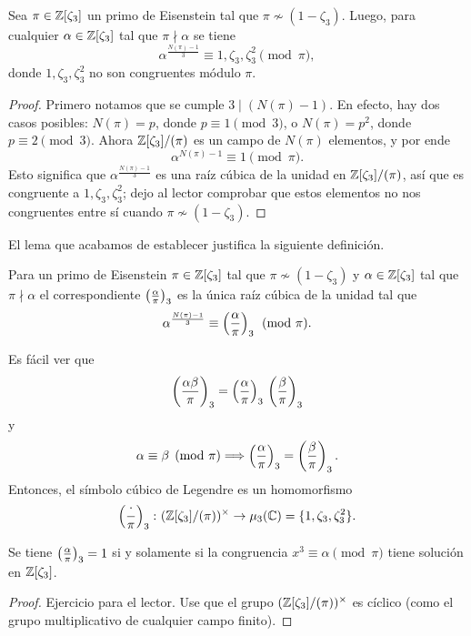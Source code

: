 \begin{lema}
  Sea $\pi \in \mathbb{Z} [\zeta_3]$ un primo de Eisenstein tal que
  $\pi\not\sim (1-\zeta_3)$. Luego, para cualquier $\alpha \in \mathbb{Z} [\zeta_3]$
  tal que $\pi\nmid\alpha$ se tiene
  $$\alpha^{\frac{N (\pi) - 1}{3}} \equiv 1, \zeta_3, \zeta_3^2 \pmod{\pi},$$
  donde $1,\zeta_3,\zeta_3^2$ no son congruentes módulo $\pi$.

  \begin{proof}
    Primero notamos que se cumple $3 \mid (N (\pi) - 1)$. En efecto, hay dos
    casos posibles: $N (\pi) = p$, donde $p\equiv 1 \pmod{3}$,
    o $N (\pi) = p^2$, donde $p \equiv 2 \pmod{3}$. Ahora $\mathbb{Z} [\zeta_3]/(\pi)$
    es un campo de $N (\pi)$ elementos, y por ende
    $$\alpha^{N (\pi) - 1} \equiv 1 \pmod{\pi}.$$
    Esto significa que $\alpha^{\frac{N (\pi) - 1}{3}}$ es una raíz cúbica de la
    unidad en $\mathbb{Z} [\zeta_3]/(\pi)$, así que es congruente a
    $1,\zeta_3,\zeta_3^2$; dejo al lector comprobar que estos
    elementos no nos congruentes entre sí cuando $\pi\not\sim (1-\zeta_3)$.
  \end{proof}
\end{lema}

El lema que acabamos de establecer justifica la siguiente definición.

\begin{definicion}
  Para un primo de Eisenstein $\pi \in \mathbb{Z} [\zeta_3]$ tal que
  $\pi\not\sim (1-\zeta_3)$ y $\alpha\in\mathbb{Z} [\zeta_3]$ tal que
  $\pi\nmid\alpha$ el  correspondiente
  $\left(\frac{\alpha}{\pi}\right)_3$ es la única raíz cúbica de la unidad tal que
  $$\alpha^{\frac{N (\pi) - 1}{3}} \equiv \left(\frac{\alpha}{\pi}\right)_3 \pmod{\pi}.$$
\end{definicion}

Es fácil ver que
\[ \left(\frac{\alpha\beta}{\pi}\right)_3
       = \left(\frac{\alpha}{\pi}\right)_3\,\left(\frac{\beta}{\pi}\right)_3 \]
y
\[ \alpha\equiv\beta\pmod{\pi} \Longrightarrow \left(\frac{\alpha}{\pi}\right)_3
       = \left(\frac{\beta}{\pi}\right)_3. \]
Entonces, el símbolo cúbico de Legendre es un homomorfismo
\[ \left(\frac{\cdot}{\pi}\right)_3\colon (\mathbb{Z} [\zeta_3]/(\pi))^\times
       \to \mu_3 (\mathbb{C}) = \{ 1,\zeta_3,\zeta_3^2 \}. \]

\begin{lema}
  Se tiene $\left(\frac{\alpha}{\pi}\right)_3 = 1$ si y solamente si la congruencia
  $x^3 \equiv \alpha \pmod{\pi}$ tiene solución en $\mathbb{Z} [\zeta_3]$.

  \begin{proof}
    Ejercicio para el lector. Use que el grupo $(\mathbb{Z} [\zeta_3]/(\pi))^\times$
    es cíclico (como el grupo multiplicativo de cualquier campo finito).
  \end{proof}
\end{lema}


